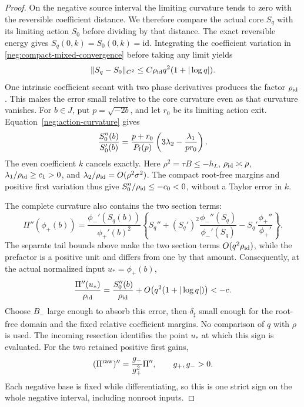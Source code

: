 \begin{proof}
On the negative source interval the limiting curvature tends to zero
with the reversible coefficient distance. We therefore compare the
actual core \(S_q\) with its limiting action \(S_0\) before dividing
by that distance. The exact reversible energy gives
\(S_q(0,k)=S_0(0,k)=\mathrm{id}\). Integrating the coefficient
variation in \eqref{neg:compact-mixed-convergence} before taking any
limit yields
\[
 \|S_q-S_0\|_{C^2}
 \le C\rho_{\rm id}q^2(1+|\log q|).
\]
One intrinsic coefficient secant with two phase derivatives produces
the factor \(\rho_{\rm id}\). This makes the error small relative
to the core curvature even as that curvature vanishes.
For \(b\in J\), put \(p=\sqrt{-2b}\), and let \(r_0\) be its
limiting action exit. Equation~\eqref{neg:action-curvature} gives
\[
 \frac{S_0''(b)}{S_0'(b)}
 =\frac{p+r_0}{P_{\rm f}(p)}
       \left(3\lambda_2-\frac{\lambda_1}{pr_0}\right).
\]
The even coefficient \(k\) cancels exactly. Here
\(\rho^2=\tau B\le-h_L\), \(\rho_{\rm id}\asymp\rho\),
\(\lambda_1/\rho_{\rm id}\ge c_1>0\), and
\(\lambda_2/\rho_{\rm id}=O(\rho^2\sigma^2)\).
The compact root-free margins and positive first variation thus give
\(S_0''/\rho_{\rm id}\le-c_0<0\), without a Taylor error in \(k\).

The complete curvature also contains the two section terms:
\[
 \Pi''(\phi_+(b))=
 \frac{\phi_-'(S_q(b))}{\phi_+'(b)^2}
 \left\{S_q''+(S_q')^2\frac{\phi_-''(S_q)}{\phi_-'(S_q)}
                  -S_q'\frac{\phi_+''}{\phi_+'}\right\}.
\]
The separate tail bounds above make the two section terms
\(O(q^2\rho_{\rm id})\), while the prefactor is a positive unit
and differs from one by that amount. Consequently, at the actual
normalized input \(u_*=\phi_+(b)\),
\begin{equation}\label{bd:relative-negative-curvature}
 \frac{\Pi''(u_*)}{\rho_{\rm id}}
 =\frac{S_0''(b)}{\rho_{\rm id}}
       +O\bigl(q^2(1+|\log q|)\bigr)<-c .
\end{equation}
Choose \(B_-\) large enough to absorb this error, then
\(\delta_\sharp\) small enough for the root-free domain and the
fixed relative coefficient margins. No comparison of \(q\) with \(\rho\) is used.
The incoming resection identifies the point $u_*$ at which this sign
is evaluated. For the two retained positive first gains,
\begin{equation}\label{bd:relative-raw-curvature}
 (\Pi^{\rm raw})''=\frac{g_-}{g_+^2}\Pi'',\qquad g_+,g_->0.
\end{equation}
Each negative base is fixed while differentiating, so this is one
strict sign on the whole negative interval, including nonroot inputs.


\end{proof}
